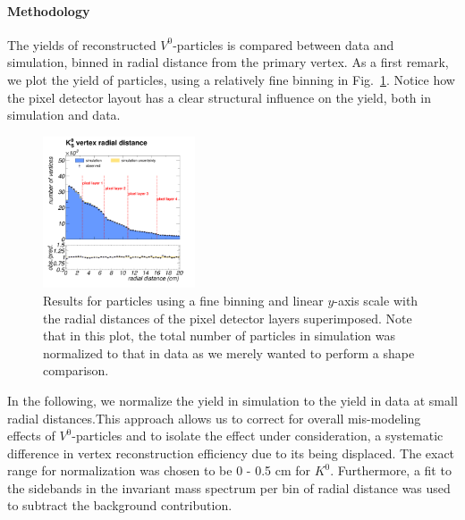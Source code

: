 \paragraph{Methodology}\label{sec:methodology}
The yields of reconstructed $V^0$-particles is compared between data and simulation, binned in radial distance from the primary vertex. As a first remark, we plot the yield of \PKzS particles, using a relatively fine binning in Fig.~\ref{fig:2017_detector}. Notice how the pixel detector layout has a clear structural influence on the yield, both in simulation and data.
\begin{figure}[h]
    \centering
    \includegraphics[width=0.40\textwidth]{Figures/c6/efficiencies/2017E_detector}
    \caption{Results for \PKzS particles using a fine binning and linear $y$-axis scale with the radial distances of the pixel detector layers superimposed. Note that in this plot, the total number of \PKzS particles in simulation was normalized to that in data as we merely wanted to perform a shape comparison.}
    \label{fig:2017_detector}
\end{figure}

In the following, we normalize the yield in simulation to the yield in
data at small radial distances.This approach allows us to correct for
overall mis-modeling effects of $V^0$-particles
and to isolate the effect under consideration, \ie a systematic
difference in vertex reconstruction efficiency due to its being
displaced. The exact range for normalization was chosen to be 0 - 0.5
cm for $K^0$. Furthermore, a fit to the sidebands in the invariant mass spectrum per bin of radial distance was used to subtract the background contribution.

